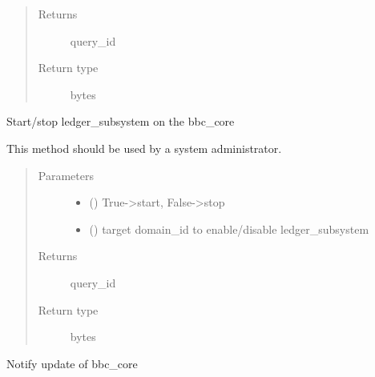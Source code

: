 \documentclass[letterpaper,10pt,english]{sphinxmanual}
\begin{document}
\begin{fulllineitems}
\begin{fulllineitems}
\begin{quote}
\begin{description}
\item[{Returns}] \leavevmode
query\_id

\item[{Return type}] \leavevmode
bytes

\end{description}\end{quote}

\end{fulllineitems}


\begin{fulllineitems}
\label{\detokenize{bbc1.core.bbc_app:bbc1.core.bbc_app.BBcAppClient.manipulate_ledger_subsystem}}
Start/stop ledger\_subsystem on the bbc\_core

This method should be used by a system administrator.
\begin{quote}\begin{description}
\item[{Parameters}] \leavevmode\begin{itemize}
\item {} 
 () \textendash{} True-\textgreater{}start, False-\textgreater{}stop

\item {} 
 () \textendash{} target domain\_id to enable/disable ledger\_subsystem

\end{itemize}

\item[{Returns}] \leavevmode
query\_id

\item[{Return type}] \leavevmode
bytes

\end{description}\end{quote}

\end{fulllineitems}


\begin{fulllineitems}
\label{\detokenize{bbc1.core.bbc_app:bbc1.core.bbc_app.BBcAppClient.notify_domain_key_update}}
Notify update of bbc\_core


\end{fulllineitems}
\end{fulllineitems}
\end{document}
